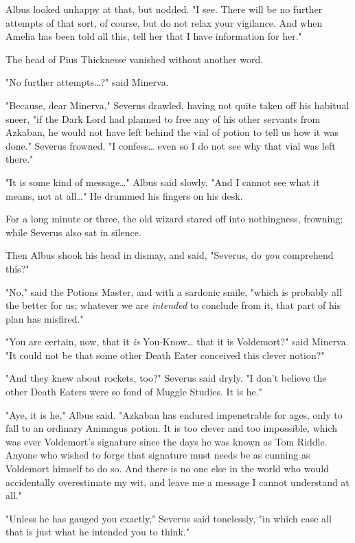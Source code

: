 Albus looked unhappy at that, but nodded. "I see. There will be no further 
attempts of that sort, of course, but do not relax your vigilance. And when 
Amelia has been told all this, tell her that I have information for her."

The head of Pius Thicknesse vanished without another word.

"No further attempts{\ldots}?" said Minerva.

"Because, dear Minerva," Severus drawled, having not quite taken off his 
habitual sneer, "if the Dark Lord had planned to free any of his other servants 
from Azkaban, he would not have left behind the vial of potion to tell us how 
it was done." Severus frowned. "I confess{\ldots} even so I do not see why that 
vial was left there."

"It is some kind of message{\ldots}" Albus said slowly. "And I cannot see what 
it means, not at all{\ldots}" He drummed his fingers on his desk.

For a long minute or three, the old wizard stared off into nothingness, 
frowning; while Severus also sat in silence.

Then Albus shook his head in dismay, and said, "Severus, do \emph{you} 
comprehend this?"

"No," said the Potions Master, and with a sardonic smile, "which is probably 
all the better for us; whatever we are \emph{intended} to conclude from it, 
that part of his plan has misfired."

"You are certain, now, that it \emph{is} You-Know{\ldots} that it is 
Voldemort?" said Minerva. "It could not be that some other Death Eater 
conceived this clever notion?"

"And they knew about rockets, too?" Severus said dryly. "I don't believe the 
other Death Eaters were so fond of Muggle Studies. It is he."

"Aye, it is he," Albus said. "Azkaban has endured impenetrable for ages, only 
to fall to an ordinary Animagus potion. It is too clever and too impossible, 
which was ever Voldemort's signature since the days he was known as Tom Riddle. 
Anyone who wished to forge that signature must needs be as cunning as Voldemort 
himself to do so. And there is no one else in the world who would accidentally 
overestimate my wit, and leave me a message I cannot understand at all."

"Unless he has gauged you exactly," Severus said tonelessly, "in which case all 
that is just what he intended you to think."

